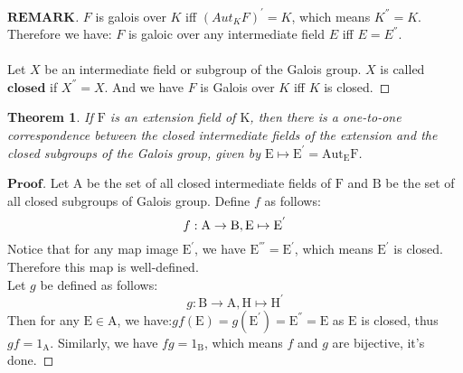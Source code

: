 \documentclass[a4paper, 11pt]{article}
\newtheorem{theorem}{Theorem}
\theoremstyle{remark}
\newenvironment{myremark}
{\renewcommand\qedsymbol{$ $}\begin{proof}[$\mathbf{REMARK}$]}
  {\end{proof}}
\newenvironment{myprf}
{\renewcommand\qedsymbol{$ $}\begin{proof}[$\mathbf{Proof}$]}
  {\end{proof}}
\theoremstyle{definition}
\begin{document}
    \begin{myremark}
            $F$ is galois over $K$ iff $(Aut_K F)^{'}=K$, which means $K^{''}=K$. 
            Therefore we have: $F$ is galoic over any intermediate field $E$ iff 
            $E=E^{''}$.\\
            \vspace{0.1cm}\\
            \indent
            Let $X$ be an intermediate field or subgroup of the Galois group. $X$ is
            called $\textbf{closed}$ if $X^{''}=X$. And we have $F$ is Galois over $K$
            iff $K$ is closed.
    \end{myremark}
    \vspace{0.4cm}
    \begin{theorem}
            If $\mathrm{F}$ is an extension field of $\mathrm{K}$, then there is a one-to-one correspondence 
        between the closed intermediate fields of the extension and the closed subgroups
        of the Galois group, given by $\mathrm{E}\mapsto \mathrm{E}^{'}=\mathrm{Aut_{E}F}$.
    \end{theorem}
    \vspace{0.1cm}
    \begin{myprf}
        Let $\mathrm{A}$  be the set of all closed intermediate fields of $\mathrm{F}$ and
        $\mathrm{B}$ be the set of all closed subgroups of Galois group. Define $f$ 
        as follows:
        $$
        f:\mathrm{A}\rightarrow \mathrm{B},\mathrm{E} \mapsto \mathrm{E}^{'}\\
        $$ Notice that for any map image $\mathrm{E}^{'}$, we have $\mathrm{E}^{'''}=
        \mathrm{E}^{'}$, which means $\mathrm{E}^{'}$ is closed. Therefore this map
        is well-defined.\\
        Let $g$ be defined as follows:
        $$
        g:\mathrm{B}\rightarrow \mathrm{A}, \mathrm{H}\mapsto \mathrm{H}^{'}
        $$ Then for any $\mathrm{E}\in \mathrm{A}$, we have:$gf(\mathrm{E})=
        g(\mathrm{E}^{'})=\mathrm{E}^{''}=\mathrm{E}$ as $\mathrm{E}$ is closed, 
        thus $gf=1_{\mathrm{A}}$. Similarly, we have $fg=1_{\mathrm{B}}$, which means
        $f$ and $g$ are bijective, it's done.
    \end{myprf}
    \vspace{0.5cm}
\end{document}

